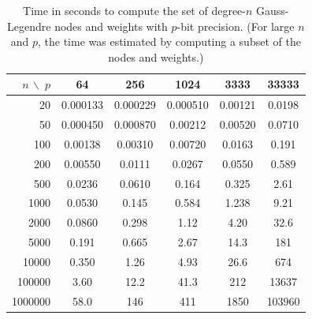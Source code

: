 \documentclass[nohypdvips,review]{siamart0216}
\begin{document}
\begin{table}[h!]
\caption{Time in seconds to compute the set of degree-$n$ Gauss-Legendre nodes and weights with $p$-bit precision.
(For large $n$ and $p$, the time was estimated by computing a subset of the nodes and weights.)}
\label{tab:timings}
\begin{center}
\begin{tabular}{ r | c c c c c }
$n\, \backslash \; p$ & 64 & 256 & 1024 & 3333 & 33333 \\
\hline\rule{0pt}{3ex}
20  & 0.000133  &  0.000229  &  0.000510  &  0.00121  &  0.0198  \\
50  & 0.000450  &  0.000870  &  0.00212  &  0.00520  &  0.0710  \\
100  & 0.00138  &  0.00310  &  0.00720  &  0.0163  &  0.191  \\
200  & 0.00550  &  0.0111  &  0.0267  &  0.0550  &  0.589  \\
500  & 0.0236  &  0.0610  &  0.164  &  0.325  &  2.61  \\
1000  & 0.0530  &  0.145  &  0.584  &  1.238  &  9.21  \\
2000  & 0.0860  &  0.298  &  1.12  &  4.20  &  32.6  \\
5000  & 0.191  &  0.665  &  2.67  &  14.3  &  181  \\
10000  & 0.350  &  1.26  &  4.93  &  26.6  &  674  \\
100000  & 3.60  &  12.2  &  41.3  &  212  &  13637  \\
1000000  & 58.0  &  146  &  411  &  1850  &  103960  \\
\end{tabular}
\end{center}
\end{table}

\end{document}
